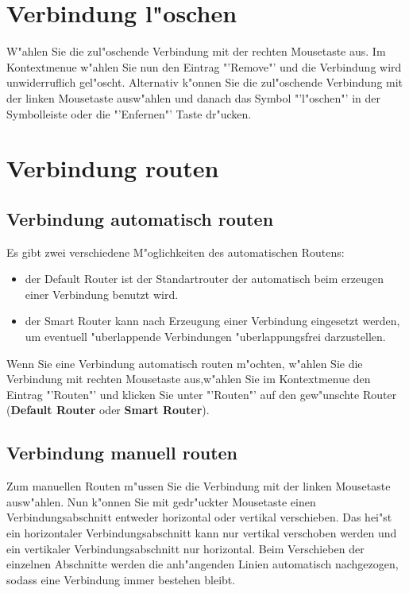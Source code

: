 \documentclass[a4paper,titlepage,12pt,ngerman]{scrbook}
\begin{document}
\section{Verbindung l"oschen}
W"ahlen Sie die zul"oschende Verbindung mit der rechten Mousetaste aus. Im Kontextmenue w"ahlen Sie nun den Eintrag "'Remove"' und die Verbindung wird unwiderruflich gel"oscht.
Alternativ k"onnen Sie die zul"oschende Verbindung mit der linken Mousetaste ausw"ahlen und danach das Symbol "'l"oschen"' in der Symbolleiste oder die "'Enfernen"' Taste dr"ucken. 


\section{Verbindung routen}
\subsection{Verbindung automatisch routen}
Es gibt zwei verschiedene M"oglichkeiten des automatischen Routens:
\begin{itemize}
\item der Default Router ist der Standartrouter der automatisch beim erzeugen einer Verbindung benutzt wird.
\item der Smart Router kann nach Erzeugung einer Verbindung eingesetzt werden, um eventuell "uberlappende Verbindungen "uberlappungsfrei darzustellen.
\end{itemize}
Wenn Sie eine Verbindung automatisch routen m"ochten, w"ahlen Sie die Verbindung mit rechten Mousetaste aus,w"ahlen Sie im Kontextmenue den Eintrag "'Routen"' und klicken Sie unter "'Routen"' auf den gew"unschte Router ({\bf Default Router} oder {\bf Smart Router}).

\subsection{Verbindung manuell routen}
Zum manuellen Routen m"ussen Sie die Verbindung mit der linken Mousetaste ausw"ahlen. Nun k"onnen Sie mit gedr"uckter Mousetaste einen Verbindungsabschnitt entweder horizontal oder vertikal verschieben. Das hei"st ein horizontaler Verbindungsabschnitt kann nur vertikal verschoben werden und ein vertikaler Verbindungsabschnitt nur horizontal. Beim Verschieben der einzelnen Abschnitte werden die anh"angenden Linien automatisch nachgezogen, sodass eine Verbindung immer bestehen bleibt.
\end{document}
